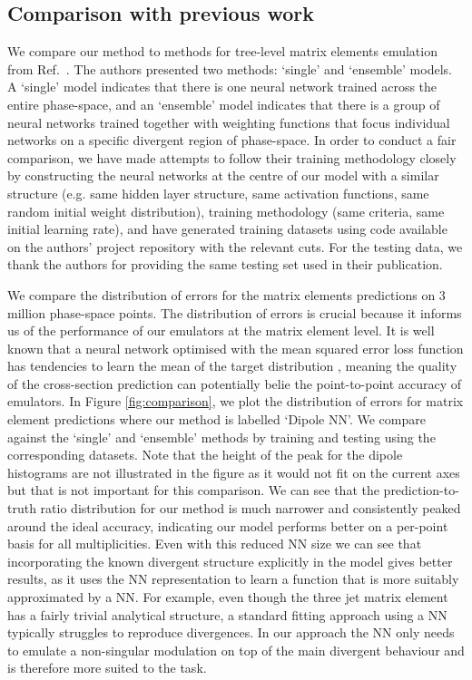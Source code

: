 \documentclass[main.tex]{subfiles}
\begin{document}
\subsection{Comparison with previous work}\label{sec:n3jet_comparison}
We compare our method to methods for tree-level matrix elements emulation from Ref.~\cite{Badger:2020uow}.
The authors presented two methods: `single' and `ensemble' models. A `single' model indicates that there is 
one neural network trained across the entire phase-space, and an `ensemble' model indicates that there is a group of neural networks trained together
with weighting functions that focus individual networks on a specific divergent region of phase-space.
In order to conduct a fair comparison, we have made attempts to follow their training methodology closely by 
constructing the neural networks at the centre of our model with a similar structure (e.g. same hidden layer structure, same activation functions, 
same random initial weight distribution), training methodology (same {\EarlyStopping} criteria, same initial learning rate), and have generated training datasets using code 
available on the authors' project repository with the relevant cuts.
For the testing data, we thank the authors for providing the same testing set used in their publication.

We compare the distribution of errors for the matrix elements predictions on 3 million phase-space points.
The distribution of errors is crucial because it informs us of the performance of our emulators at the matrix element level.
It is well known that a neural network optimised with the mean squared error loss function has tendencies to learn the mean of the target distribution \cite{Nachman_2020},
meaning the quality of the cross-section prediction can potentially belie the point-to-point accuracy of emulators.
In Figure \ref{fig:comparison}, we plot the distribution of errors for matrix element predictions where our method is labelled `Dipole NN'.
We compare against the `single' and `ensemble' methods by training and testing using the corresponding datasets.
Note that the height of the peak for the dipole histograms are not illustrated in the figure as it would not fit on the current axes but that is not important for this comparison.
We can see that the prediction-to-truth ratio distribution for our method is much narrower and consistently peaked around the ideal accuracy, indicating our model performs better on a per-point basis for all multiplicities.
Even with this reduced NN size we can see that incorporating the known
divergent structure explicitly in the model gives better results, as it
uses the NN representation to learn a function that is more
suitably approximated by a NN.
For example, even though the three jet matrix element has a fairly trivial analytical structure, a standard
fitting approach using a NN typically struggles to reproduce
divergences. In our approach the NN only needs to emulate a non-singular
modulation on top of the main divergent behaviour and is therefore more
suited to the task.
\end{document}
